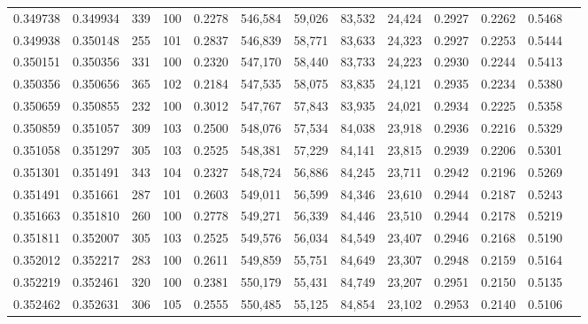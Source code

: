 \begin{tabular}{rrrrrrrrrrrrr}
0.349738 & 0.349934 &   339 & 100 &                                     0.2278 & 546,584 &  59,026 &  83,532 &  24,424 & 0.2927 & 0.2262 & 0.5468 \\
0.349938 & 0.350148 &   255 & 101 &                                     0.2837 & 546,839 &  58,771 &  83,633 &  24,323 & 0.2927 & 0.2253 & 0.5444 \\
0.350151 & 0.350356 &   331 & 100 &                                     0.2320 & 547,170 &  58,440 &  83,733 &  24,223 & 0.2930 & 0.2244 & 0.5413 \\
0.350356 & 0.350656 &   365 & 102 &                                     0.2184 & 547,535 &  58,075 &  83,835 &  24,121 & 0.2935 & 0.2234 & 0.5380 \\
0.350659 & 0.350855 &   232 & 100 &                                     0.3012 & 547,767 &  57,843 &  83,935 &  24,021 & 0.2934 & 0.2225 & 0.5358 \\
0.350859 & 0.351057 &   309 & 103 &                                     0.2500 & 548,076 &  57,534 &  84,038 &  23,918 & 0.2936 & 0.2216 & 0.5329 \\
0.351058 & 0.351297 &   305 & 103 &                                     0.2525 & 548,381 &  57,229 &  84,141 &  23,815 & 0.2939 & 0.2206 & 0.5301 \\
0.351301 & 0.351491 &   343 & 104 &                                     0.2327 & 548,724 &  56,886 &  84,245 &  23,711 & 0.2942 & 0.2196 & 0.5269 \\
0.351491 & 0.351661 &   287 & 101 &                                     0.2603 & 549,011 &  56,599 &  84,346 &  23,610 & 0.2944 & 0.2187 & 0.5243 \\
0.351663 & 0.351810 &   260 & 100 &                                     0.2778 & 549,271 &  56,339 &  84,446 &  23,510 & 0.2944 & 0.2178 & 0.5219 \\
0.351811 & 0.352007 &   305 & 103 &                                     0.2525 & 549,576 &  56,034 &  84,549 &  23,407 & 0.2946 & 0.2168 & 0.5190 \\
0.352012 & 0.352217 &   283 & 100 &                                     0.2611 & 549,859 &  55,751 &  84,649 &  23,307 & 0.2948 & 0.2159 & 0.5164 \\
0.352219 & 0.352461 &   320 & 100 &                                     0.2381 & 550,179 &  55,431 &  84,749 &  23,207 & 0.2951 & 0.2150 & 0.5135 \\
0.352462 & 0.352631 &   306 & 105 &                                     0.2555 & 550,485 &  55,125 &  84,854 &  23,102 & 0.2953 & 0.2140 & 0.5106 \\

\end{tabular}
